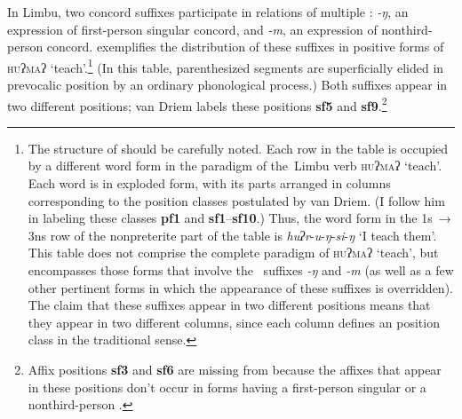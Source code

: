 \documentclass[output=paper,
modfonts
]{LSP/langsci}
\begin{document}
In Limbu, two  concord suffixes participate in relations of multiple :  \textit{\nobreakdash-ŋ}, an expression of first\nobreakdash-person singular  concord, and \textit{\nobreakdash-m}, an expression of nonthird\nobreakdash-person   concord.  exemplifies the distribution of these suffixes in positive forms of \textsc{huʔmaʔ} ‘teach’.\footnote{The structure of  should be carefully noted. Each row in the table is occupied by a different word form in the paradigm of the~Limbu verb \textsc{huʔmaʔ} ‘teach’. Each word is in exploded form, with its parts arranged in columns corresponding to the  position classes postulated by van Driem. (I follow him in labeling these classes \textbf{pf1} and \textbf{sf1}–\textbf{sf10}.) Thus, the word form in the 1s~→ 3ns row of the nonpreterite part of the table is \textit{huʔr}{}-\textit{u}{}-\textit{ŋ}{}-\textit{si}{}-\textit{ŋ} ‘I teach them’. This table does not comprise the complete paradigm of \textsc{huʔmaʔ} ‘teach’, but encompasses those forms that involve the~  suffixes \textit{{}-ŋ} and \textit{{}-m} (as well as a few other pertinent forms in which the appearance of these suffixes is overridden). The claim that these suffixes appear in two different positions means that they appear in two different columns, since each column defines an  position class in the traditional sense.}   (In this table, parenthesized segments are superficially elided in prevocalic position by an ordinary phonological process.)  Both suffixes appear in two different  positions;  van Driem \citeyearpar{Driem1987} labels these positions \textbf{sf5} and \textbf{sf9}.\footnote{Affix positions \textbf{sf3} and \textbf{sf6} are missing from  because the affixes that appear in these positions don’t occur in forms having a first\nobreakdash-person singular  or a nonthird\nobreakdash-person  .}
\end{document}
